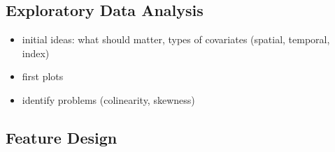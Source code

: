 \documentclass{article}
\begin{document}
\subsection{Exploratory Data Analysis}

\begin{itemize}

\item initial ideas: what should matter, types of covariates (spatial, temporal, index)
\item first plots
\item identify problems (colinearity, skewness)

\end{itemize}

\subsection{Feature Design}\label{Engineering}
\end{document}
